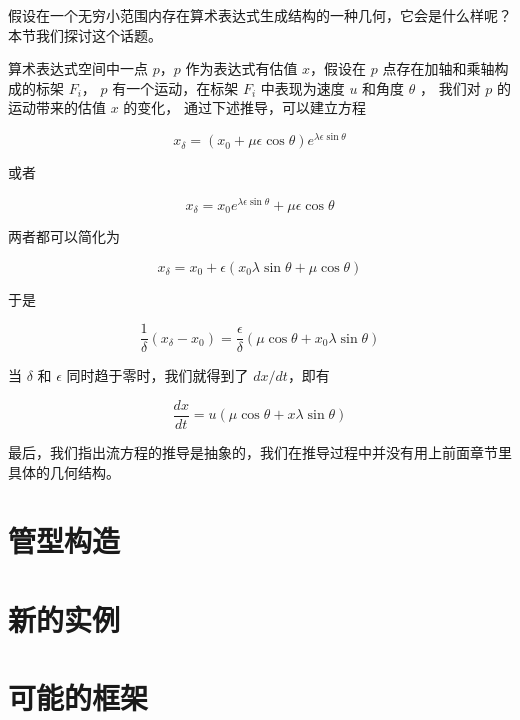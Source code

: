 \documentclass[a4paper,12pt]{article}
\begin{document}
假设在一个无穷小范围内存在算术表达式生成结构的一种几何，它会是什么样呢？本节我们探讨这个话题。

算术表达式空间中一点 $p$，$p$ 作为表达式有估值 $x$，假设在 $p$ 点存在加轴和乘轴构成的标架 $F_i$，
$p$ 有一个运动，在标架 $F_i$ 中表现为速度 $u$ 和角度 $\theta$ ， 我们对 $p$ 的运动带来的估值 $x$ 的变化，
通过下述推导，可以建立方程

\begin{equation}
    x_{\delta} = (x_0 + \mu \epsilon \cos \theta)e^{\lambda \epsilon \sin \theta}
\end{equation}

或者

\begin{equation}
    x_{\delta} = x_0 e^{\lambda \epsilon \sin \theta} + \mu \epsilon \cos \theta
\end{equation}

两者都可以简化为

\begin{equation}
    x_{\delta} = x_0 + \epsilon (x_0 \lambda \sin \theta + \mu \cos \theta)
\end{equation}

于是

\begin{equation}
    \frac{1}{\delta} (x_{\delta} - x_0) = \frac{\epsilon}{\delta} (\mu \cos \theta + x_0 \lambda \sin \theta)
\end{equation}

当 $\delta$ 和 $\epsilon$ 同时趋于零时，我们就得到了 $dx / dt$，即有

\begin{equation}
    \frac{dx}{dt} = u (\mu \cos \theta + x \lambda \sin \theta)
\end{equation}

最后，我们指出流方程的推导是抽象的，我们在推导过程中并没有用上前面章节里具体的几何结构。

\newpage

\section{管型构造}

\newpage

\section{新的实例}

\newpage

\section{可能的框架}

\newpage
{}
{}


\end{document}
